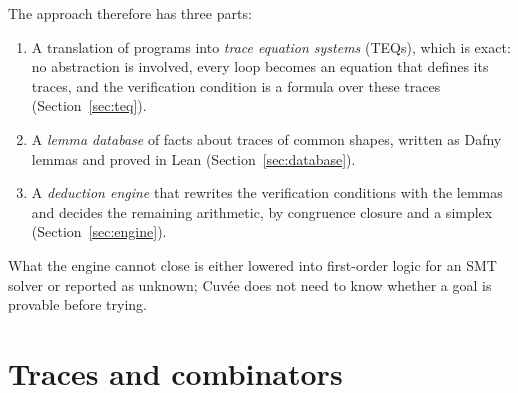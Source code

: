 \documentclass[a4paper,11pt]{article}
\newcommand{\cuvee}{Cuvée}
\begin{document}
The approach therefore has three parts:
\begin{enumerate}
\item A translation of programs into \emph{trace equation systems} (TEQs), which is exact: no abstraction is involved,
  every loop becomes an equation that defines its traces, and the verification condition is a formula over these
  traces (Section~\ref{sec:teq}).
\item A \emph{lemma database} of facts about traces of common shapes, written as Dafny lemmas and proved in Lean
  (Section~\ref{sec:database}).
\item A \emph{deduction engine} that rewrites the verification conditions with the lemmas and decides the remaining
  arithmetic, by congruence closure and a simplex (Section~\ref{sec:engine}).
\end{enumerate}
What the engine cannot close is either lowered into first-order logic for an SMT solver or reported as unknown;
\cuvee{} does not need to know whether a goal is provable before trying.

\section{Traces and combinators}
\label{sec:traces}
\end{document}

